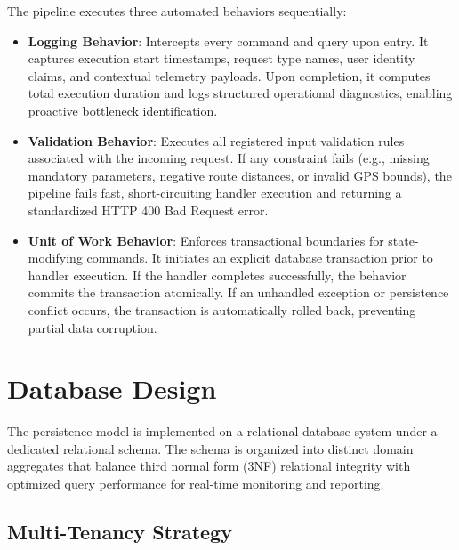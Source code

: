 The pipeline executes three automated behaviors sequentially:
\begin{itemize}
  \item \textbf{Logging Behavior}: Intercepts every command and query upon entry. It captures execution start timestamps, request type names, user identity claims, and contextual telemetry payloads. Upon completion, it computes total execution duration and logs structured operational diagnostics, enabling proactive bottleneck identification.
  \item \textbf{Validation Behavior}: Executes all registered input validation rules associated with the incoming request. If any constraint fails (e.g., missing mandatory parameters, negative route distances, or invalid GPS bounds), the pipeline fails fast, short-circuiting handler execution and returning a standardized HTTP 400 Bad Request error.
  \item \textbf{Unit of Work Behavior}: Enforces transactional boundaries for state-modifying commands. It initiates an explicit database transaction prior to handler execution. If the handler completes successfully, the behavior commits the transaction atomically. If an unhandled exception or persistence conflict occurs, the transaction is automatically rolled back, preventing partial data corruption.
\end{itemize}

\section{Database Design}
\label{sec:database_design}

The persistence model is implemented on a relational database system under a dedicated relational schema. The schema is organized into distinct domain aggregates that balance third normal form (3NF) relational integrity with optimized query performance for real-time monitoring and reporting.

\subsection{Multi-Tenancy Strategy}
\label{sec:multitenancy}

